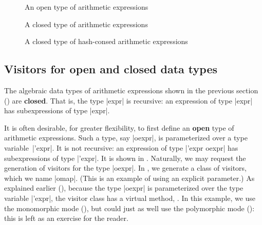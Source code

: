 \documentclass[11pt,a4paper,twoside]{article}
\renewcommand{\emph}[1]{\textbf{#1}}
\begin{document}

\begin{figure}[p]
\vspace{-\baselineskip}
\caption{An open type of arithmetic expressions} %
\label{fig:expr12}
\end{figure}

\begin{figure}[p]
\caption{A closed type of arithmetic expressions}
\label{fig:expr13}
\end{figure}

\begin{figure}[p]
\caption{A closed type of hash-consed arithmetic expressions}
\label{fig:expr08}
\end{figure}

\subsection{Visitors for open and closed data types}
\label{sec:advanced:openclosed}

The algebraic data types of arithmetic expressions shown in the previous
section () are \emph{closed}. That is, the type \oc|expr|
is recursive: an expression of type \oc|expr| has subexpressions of type
\oc|expr|.

It is often desirable, for greater flexibility, to first define an \emph{open}
type of arithmetic expressions. Such a type, say \oc|oexpr|, is parameterized
over a type variable~\oc|'expr|. It is not recursive: an expression of type
\oc|'expr oexpr| has subexpressions of type \oc|'expr|. It is shown in
. Naturally, we may request the generation of visitors for
the type \oc|oexpr|. In , we generate a class of \map
visitors, which we name \oc|omap|. (This is an example of using an explicit
\name parameter.) As explained earlier (),
because the type \oc|oexpr| is parameterized over the type variable
\oc|'expr|, the visitor class has a virtual method, .
%
In this example, we use the monomorphic mode (),
but could just as well use the polymorphic mode ():
this is left as an exercise for the reader.
\end{document}
